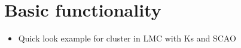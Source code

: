 

\section{Basic functionality%
  \label{basic-functionality}%
}

\begin{itemize}
\item Quick look example for cluster in LMC with Ks and SCAO
\end{itemize}
